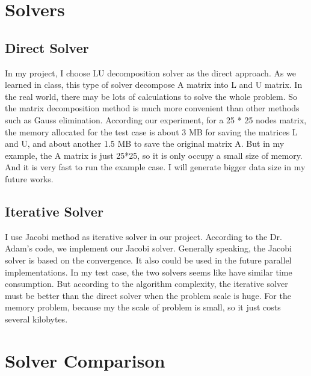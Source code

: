 \documentclass{article}
\begin{document}
\begin{spacing}{1.1}
\begin{itemize}
\end{itemize}

\section{Solvers}

\subsection{Direct Solver}

\begin{itemize}

    In my project, I choose LU decomposition solver as the direct approach. As we learned in class, this type of solver decompose A matrix into L and U matrix. In the real world, there may be lots of calculations to solve the whole problem. So the matrix decomposition method is much more convenient than other methods such as Gauss elimination.\newline
    According our experiment, for a 25 * 25 nodes matrix, the memory allocated for the test case is about 3 MB for saving the matrices L and U, and about another 1.5 MB to save the original matrix A. But in my example, the A matrix is just 25*25, so it is only occupy a small size of memory. And it is very fast to run the example case. I will generate bigger data size in my future works.
\end{itemize}

\subsection{Iterative Solver}

\begin{itemize}
   
    I use Jacobi method as iterative solver in our project. According to the Dr. Adam's code, we implement our Jacobi solver. Generally speaking, the Jacobi solver is based on the convergence. It also could be used in the future parallel implementations. In my test case, the two solvers seems like have similar time consumption. But according to the algorithm complexity, the iterative solver must be better than the direct solver when the problem scale is huge. For the memory problem, because my the scale of problem is small, so it just costs several kilobytes.
\end{itemize}

\section{Solver Comparison}


\end{spacing}
\end{document}
